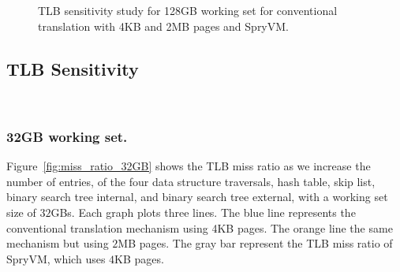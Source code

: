 \begin{figure}[t]
	\centering
	\hspace{.01in}
	
	
	\caption{TLB sensitivity study for 128GB working set for conventional translation with 4KB and 2MB pages and SpryVM.
		\label{fig:miss_ratio_128GB}}
\end{figure}

\subsection{TLB Sensitivity}

~\subsubsection{32GB working set.} Figure~\ref{fig:miss_ratio_32GB} shows the TLB miss ratio as we increase the number of entries, of the four data structure traversals, hash table, skip list, binary search tree internal, and binary search tree external, with a working set size of $32$GBs. Each graph plots three lines. The blue line represents the conventional translation mechanism using 4KB pages. The orange line the same mechanism but using $2$MB pages. The gray bar represent the TLB miss ratio of SpryVM, which uses $4$KB pages.

